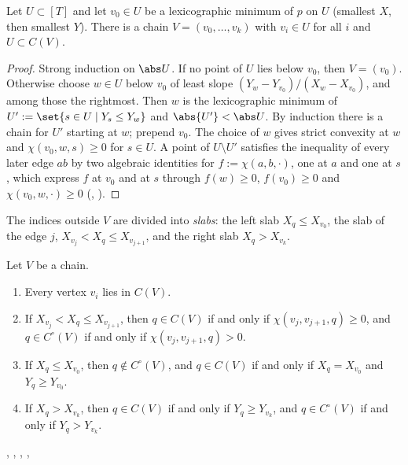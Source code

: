 \begin{lemma}\label{lem:hull}
Let $U\subset[T]$ and let $v_0\in U$ be a lexicographic minimum of $p$ on $U$ (smallest $X$, then smallest $Y$). There is a chain $V=(v_0,\dots,v_k)$ with $v_i\in U$ for all $i$ and $U\subset C(V)$. \hfill{}
\end{lemma}

\begin{proof}
Strong induction on $\abs U$. If no point of $U$ lies below $v_0$, then $V=(v_0)$. Otherwise choose $w\in U$ below $v_0$ of least slope $(Y_w-Y_{v_0})/(X_w-X_{v_0})$, and among those the rightmost. Then $w$ is the lexicographic minimum of $U':=\set{s\in U\mid Y_s\le Y_w}$ and $\abs{U'}<\abs U$. By induction there is a chain for $U'$ starting at $w$; prepend $v_0$. The choice of $w$ gives strict convexity at $w$ and $\chi(v_0,w,s)\ge0$ for $s\in U$. A point of $U\setminus U'$ satisfies the inequality of every later edge $ab$ by two algebraic identities for $f:=\chi(a,b,\cdot)$, one at $a$ and one at $s$, which express $f$ at $v_0$ and at $s$ through $f(w)\ge0$, $f(v_0)\ge0$ and $\chi(v_0,w,\cdot)\ge0$ (, ).
\end{proof}

The indices outside $V$ are divided into \emph{slabs}: the left slab $X_q\le X_{v_0}$, the slab of the edge $j$, $X_{v_j}<X_q\le X_{v_{j+1}}$, and the right slab $X_q>X_{v_k}$.

\begin{lemma}[locality]\label{lem:local-slab}
Let $V$ be a chain.
\begin{enumerate}[label=\textup{(\alph*)}]
\item Every vertex $v_i$ lies in $C(V)$.
\item If $X_{v_j}<X_q\le X_{v_{j+1}}$, then $q\in C(V)$ if and only if $\chi(v_j,v_{j+1},q)\ge0$, and $q\in C^\circ(V)$ if and only if $\chi(v_j,v_{j+1},q)>0$.
\item If $X_q\le X_{v_0}$, then $q\notin C^\circ(V)$, and $q\in C(V)$ if and only if $X_q=X_{v_0}$ and $Y_q\ge Y_{v_0}$.
\item If $X_q>X_{v_k}$, then $q\in C(V)$ if and only if $Y_q\ge Y_{v_k}$, and $q\in C^\circ(V)$ if and only if $Y_q>Y_{v_k}$.
\end{enumerate}
\hfill{}, , , , 
\end{lemma}

